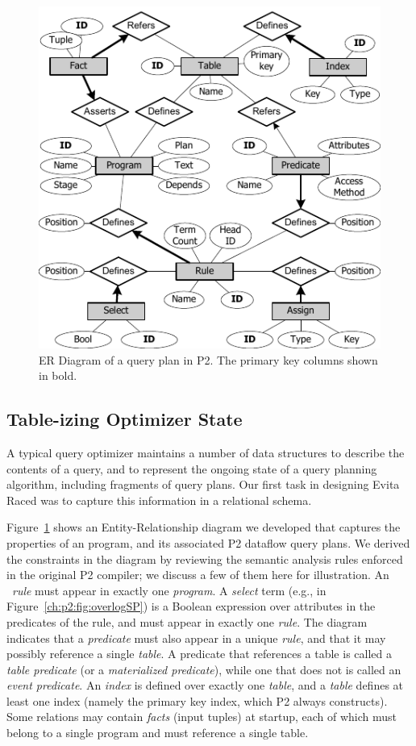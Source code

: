 \begin{figure}
\ssp
\begin{center}
\includegraphics[scale=1.3]{figures/ERDiagram}
\caption{ER Diagram of a query plan in P2. The primary key columns shown in bold.}
\label{ch:evita:fig:p2er}
\end{center}
\end{figure}

\subsection{Table-izing Optimizer State} 

A typical query optimizer maintains a number of data structures to describe the
contents of a query, and to represent the ongoing state of a query planning
algorithm, including fragments of query plans.  Our first task in designing
Evita Raced was to capture this information in a relational schema.

Figure~\ref{ch:evita:fig:p2er} shows an Entity-Relationship diagram we
developed that captures the properties of an \OVERLOG program, and its
associated P2 dataflow query plans.  We derived the constraints in the diagram
by reviewing the semantic analysis rules enforced in the original P2 compiler;
we discuss a few of them here for illustration.  An \OVERLOG~{\em rule} must
appear in exactly one {\em program}.  A {\em select} term (e.g.,
 in Figure~\ref{ch:p2:fig:overlogSP}) is a
Boolean expression over attributes in the predicates of the rule, and must
appear in exactly one {\em rule}.  The diagram indicates that a {\em predicate}
must also appear in a unique {\em rule}, and that it may possibly reference a
single {\em table}.  A predicate that references a table is called a {\em table
predicate} (or a \emph{materialized predicate}), while one that does not is
called an {\em event predicate}.  An {\em index} is defined over exactly one
{\em table}, and a {\em table} defines at least one index (namely the primary
key index, which P2 always constructs).  Some relations may contain {\em facts}
(input tuples) at startup, each of which must belong to a single program and
must reference a single table.

